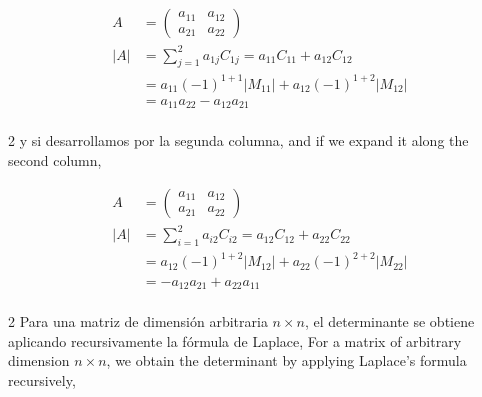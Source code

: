 \begin{align*}
A&=\begin{pmatrix}
a_{11}& a_{12}\\
a_{21}& a_{22}
\end{pmatrix}\\
\vert A \vert & =\sum_{j=1}^2a_{1j}C_{1j} =a_{11}C_{11}+a_{12}C_{12}\\
 &=a_{11}(-1)^{1+1}\vert M_{11}\vert +a_{12}(-1)^{1+2}\vert M_{12}\vert \\
 &=a_{11}a_{22}-a_{12}a_{21}\\
\end{align*}

\begin{paracol}{2}
y si desarrollamos por la segunda columna,
\switchcolumn
and if we expand it along the second column,
\end{paracol}
\begin{align*}
A&=\begin{pmatrix}
a_{11}& a_{12}\\
a_{21}& a_{22}
\end{pmatrix}\\
\vert A \vert & =\sum_{i=1}^2a_{i2}C_{i2} =a_{12}C_{12}+a_{22}C_{22}\\
 &=a_{12}(-1)^{1+2}\vert M_{12}\vert +a_{22}(-1)^{2+2}\vert M_{22}\vert \\
 &=-a_{12}a_{21}+a_{22}a_{11}\\
\end{align*}

\begin{paracol}{2}
Para una matriz de dimensión arbitraria $n\times n$, el determinante se obtiene aplicando recursivamente la fórmula de Laplace,
\switchcolumn
For a matrix of arbitrary dimension $n\times n$, we obtain the determinant by applying Laplace's formula recursively,
\end{paracol}

